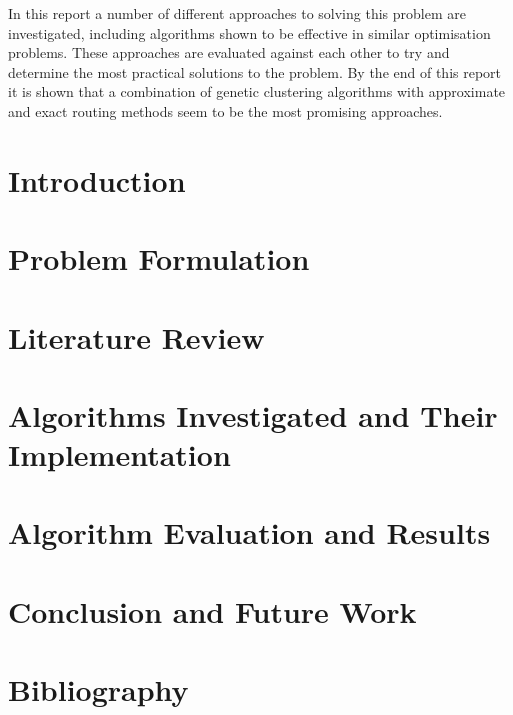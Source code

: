 \documentclass[a4paper,12pt]{article}
\begin{document}
    In this report a number of different approaches to solving this problem are investigated, including algorithms
    shown to be effective in similar optimisation problems.
    These approaches are evaluated against each other to try and determine the most practical solutions to the problem.
    By the end of this report it is shown that a combination of genetic clustering algorithms with approximate and
    exact routing methods seem to be the most promising approaches.

    \pagebreak

    \tableofcontents

    \pagebreak

    \section{Introduction}\label{sec:introduction}
    

    \pagebreak

    \section{Problem Formulation}\label{sec:problem-formulation}
    

    \pagebreak

    \section{Literature Review}\label{sec:literature-review}
    

    \pagebreak

    \section{Algorithms Investigated and Their Implementation}\label{sec:algorithms-investigated}
    

    \pagebreak

    \section{Algorithm Evaluation and Results}\label{sec:evaluation-and-results}
    

    \pagebreak

    \section{Conclusion and Future Work}\label{sec:conclusion-and-future-work}
    

    \pagebreak

    \section{Bibliography}\label{sec:bibliography}
    \printbibliography
\end{document}
